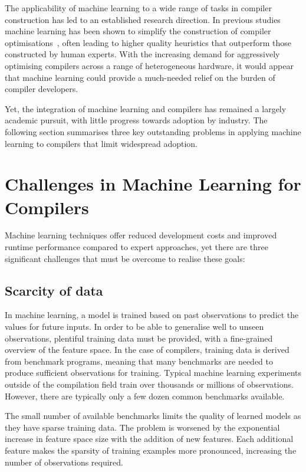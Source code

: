 The applicability of machine learning to a wide range of tasks in compiler construction has led to an established research direction. In previous studies machine learning has been shown to simplify the construction of compiler optimisations~\cite{Ashouri2018,Wang2018}, often leading to higher quality heuristics that outperform those constructed by human experts. With the increasing demand for aggressively optimising compilers across a range of heterogeneous hardware, it would appear that machine learning could provide a much-needed relief on the burden of compiler developers.

Yet, the integration of machine learning and compilers has remained a largely academic pursuit, with little progress towards adoption by industry. The following section summarises three key outstanding problems in applying machine learning to compilers that limit widespread adoption.


\newpage
\section{Challenges in Machine Learning for Compilers}
\label{sec:intro-challenges}

Machine learning techniques offer reduced development costs and improved runtime performance compared to expert approaches, yet there are three significant challenges that must be overcome to realise these goals:

\subsection{Scarcity of data}
\label{subsec:challenge-scarcity}

In machine learning, a model is trained based on past observations to predict the values for future inputs. In order to be able to generalise well to unseen observations, plentiful training data must be provided, with a fine-grained overview of the feature space. In the case of compilers, training data is derived from benchmark programs, meaning that many benchmarks are needed to produce sufficient observations for training. Typical machine learning experiments outside of the compilation field train over thousands or millions of observations. However, there are typically only a few dozen common benchmarks available.

The small number of available benchmarks limits the quality of learned models as they have sparse training data. The problem is worsened by the exponential increase in feature space size with the addition of new features. Each additional feature makes the sparsity of training examples more pronounced, increasing the number of observations required.

